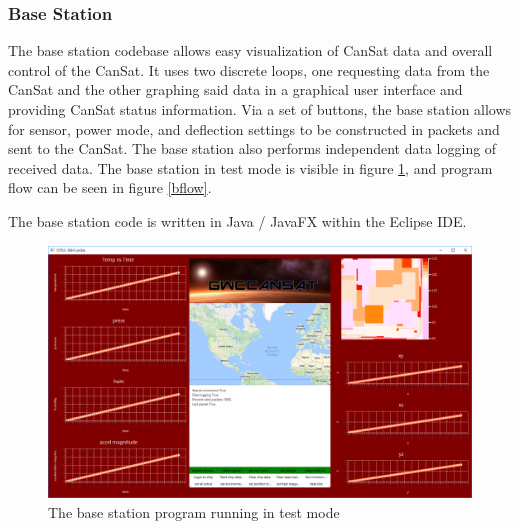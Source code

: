 \documentclass[]{report}
\begin{document}
		\subsubsection{Base Station}
		The base station codebase allows easy visualization of CanSat data and overall control of the CanSat. It uses two discrete loops, one requesting data from the CanSat and the other graphing said data in a graphical user interface and providing CanSat status information. Via a set of buttons, the base station allows for sensor, power mode, and deflection settings to be constructed in packets and sent to the CanSat. The base station also performs independent data logging of received data. The base station in test mode is visible in figure \ref{bstation}, and program flow can be seen in figure \ref{bflow}.
		
		The base station code is written in Java / JavaFX within the Eclipse IDE.
		
		\begin{figure}
			\hfill\includegraphics[scale=0.55]{base_station.png}\hspace*{\fill}
			\caption{The base station program running in test mode}
			\label{bstation}
		\end{figure}
		
\end{document}
